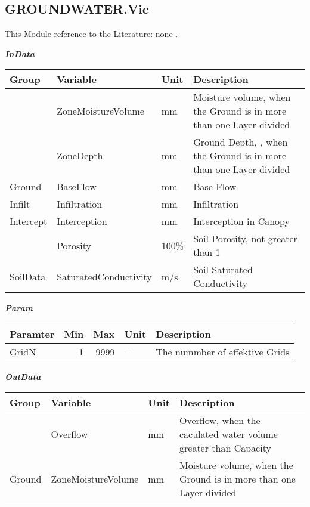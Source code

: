 \documentclass[
]{book}
\begin{document}
\hypertarget{GROUNDWATER.Vic}{%
\subsection{GROUNDWATER.Vic}\label{GROUNDWATER.Vic}}

This Module reference to the Literature: none \citep{none}.

\textbf{\emph{InData}}

\begin{table}[!h]
\centering
\begin{tabular}{l|l|l|l}
\hline
Group & Variable & Unit & Description\\
\hline
 & ZoneMoistureVolume & mm & Moisture volume, when the Ground is in more than one Layer divided\\
\cline{2-4}
 & ZoneDepth & mm & Ground Depth, , when the Ground is in more than one Layer divided\\
\cline{2-4}
\multirow{-3}{*}{\raggedright\arraybackslash Ground} & BaseFlow & mm & Base Flow\\
\cline{1-4}
Infilt & Infiltration & mm & Infiltration\\
\cline{1-4}
Intercept & Interception & mm & Interception in Canopy\\
\cline{1-4}
 & Porosity & 100\% & Soil Porosity, not greater than 1\\
\cline{2-4}
\multirow{-2}{*}{\raggedright\arraybackslash SoilData} & SaturatedConductivity & m/s & Soil Saturated Conductivity\\
\hline
\end{tabular}
\end{table}

\textbf{\emph{Param}}

\begin{table}[!h]
\centering
\begin{tabular}{l|r|r|l|l}
\hline
Paramter & Min & Max & Unit & Description\\
\hline
GridN & 1 & 9999 & -- & The nummber of effektive Grids\\
\hline
\end{tabular}
\end{table}

\textbf{\emph{OutData}}

\begin{table}[!h]
\centering
\begin{tabular}{l|l|l|l}
\hline
Group & Variable & Unit & Description\\
\hline
 & Overflow & mm & Overflow, when the caculated water volume greater than Capacity\\
\cline{2-4}
\multirow{-2}{*}{\raggedright\arraybackslash Ground} & ZoneMoistureVolume & mm & Moisture volume, when the Ground is in more than one Layer divided\\
\hline
\end{tabular}
\end{table}
\end{document}
